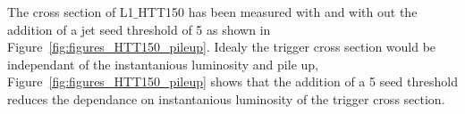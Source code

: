 The cross section of L1$\_$HTT150 has been measured with and with out the 
addition of a jet seed threshold of 5 \GeV as shown in  
Figure~\ref{fig:figures_HTT150_pileup}. Idealy the trigger cross section would 
be independant of the instantanious luminosity and pile up, 
Figure~\ref{fig:figures_HTT150_pileup} shows that the addition of a 5 \GeV seed 
threshold reduces the dependance on instantanious luminosity of the trigger 
cross section.

